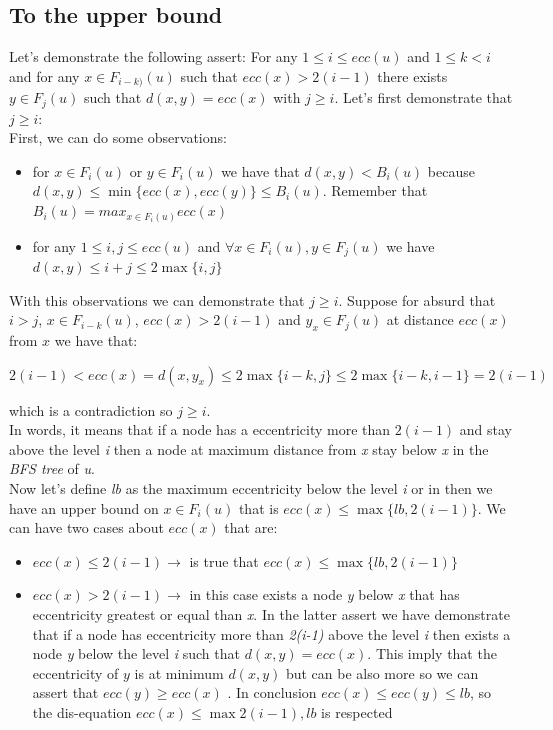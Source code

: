 \subsection{To the upper bound}
Let's demonstrate the following assert:
For any $ 1 \leq i \leq ecc(u) $ and $ 1 \leq k < i $ and for any $ x \in F_{i-k)}(u) $ such that $ ecc(x) >2(i-1) $ there exists $ y \in F_j(u) $ such that $ d(x,y) = ecc(x) $ with $ j \geq i $.
Let's first demonstrate that $ j \geq i $:\\
First, we can do some observations:
\begin{itemize}
	\item for $ x \in F_i(u) $ or $ y \in F_i(u) $ we have that $ d(x,y) < B_i(u) $ because $ d(x,y) \leq \min\{ecc(x), ecc(y)\} \leq B_i(u) $. Remember that $ B_i(u) = max_{x \in F_i(u)}ecc(x) $
	\item for any $ 1 \leq i, j \leq ecc(u) $ and $ \forall x \in F_i(u) , y \in F_j(u) $ we have $ d(x,y) \leq i + j \leq 2 \max\{i,j\} $
\end{itemize}
With this observations we can demonstrate that $ j \geq i $. Suppose for absurd that $ i > j $, $ x \in F_{i-k}(u) $, $ ecc(x) > 2(i-1) $ and $ y_x \in F_j(u)  $ at distance $ ecc(x) $ from $ x $ we have that:
\begin{center}
	$  2(i-1)< ecc(x) = d(x,y_x) \leq 2\max\{i-k, j\} \leq 2\max\{i-k, i-1\} = 2(i-1) $ 
\end{center}
which is a contradiction so $ j \geq i $.\\
In words, it means that if a node has a eccentricity more than $ 2(i-1) $ and stay above the level \textit{i} then a node at maximum distance from \textit{x} stay below \textit{x} in the \textit{BFS tree} of \textit{u}.\\
Now let's define \textit{lb} as the maximum eccentricity below the level \textit{i} or in then we have an upper bound on $ x \in F_i(u) $ that is $  ecc(x) \leq \max\{lb, 2(i-1)\}$. We can have two cases about $ ecc(x) $ that are:
\begin{itemize}
	\item $ ecc(x) \leq 2(i-1)  \rightarrow $ is true that $ ecc(x) \leq \max\{lb, 2(i-1)\} $
	\item $ ecc(x) > 2(i-1)  \rightarrow $ in this case exists a node \textit{y} below  \textit{x} that has eccentricity greatest or equal than \textit{x}. In the latter assert we have demonstrate that if a node has eccentricity more than \textit{2(i-1)} above the level \textit{i} then exists a node \textit{y} below the level \textit{i} such that $ d(x,y) = ecc(x) $. This imply that the eccentricity of $ y $ is at minimum $ d(x,y) $ but can be also more so we can assert that $ ecc(y) \geq ecc(x) $ . In conclusion $ ecc(x)  \leq ecc(y) \leq lb $, so the dis-equation $ ecc(x) \leq \max{2(i-1), lb}  $ is respected
\end{itemize}
